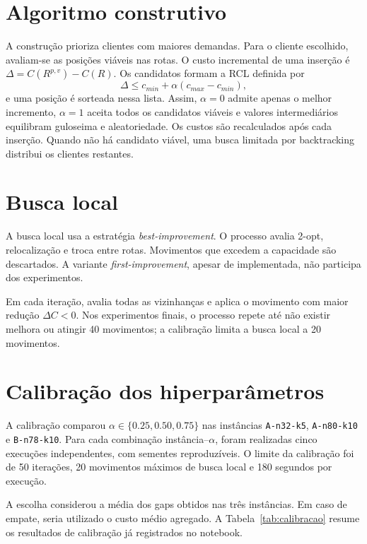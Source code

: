 \documentclass[12pt]{article}
\begin{document}
\section{Algoritmo construtivo}

A construção prioriza clientes com maiores demandas. Para o cliente escolhido, avaliam-se as posições viáveis nas rotas. O custo incremental de uma inserção é $\Delta=C(R^{p,v})-C(R)$. Os candidatos formam a RCL definida por
\begin{equation}
\Delta \leq c_{min}+\alpha(c_{max}-c_{min}),
\end{equation}
e uma posição é sorteada nessa lista. Assim, $\alpha=0$ admite apenas o melhor incremento, $\alpha=1$ aceita todos os candidatos viáveis e valores intermediários equilibram guloseima e aleatoriedade. Os custos são recalculados após cada inserção. Quando não há candidato viável, uma busca limitada por backtracking distribui os clientes restantes.

\section{Busca local}

A busca local usa a estratégia \textit{best-improvement}. O processo avalia 2-opt, relocalização e troca entre rotas. Movimentos que excedem a capacidade são descartados. A variante \textit{first-improvement}, apesar de implementada, não participa dos experimentos.

Em cada iteração, avalia todas as vizinhanças e aplica o movimento com maior redução $\Delta C<0$. Nos experimentos finais, o processo repete até não existir melhora ou atingir 40 movimentos; a calibração limita a busca local a 20 movimentos.

\section{Calibração dos hiperparâmetros}

A calibração comparou $\alpha\in\{0.25,0.50,0.75\}$ nas instâncias \texttt{A-n32-k5}, \texttt{A-n80-k10} e \texttt{B-n78-k10}. Para cada combinação instância--$\alpha$, foram realizadas cinco execuções independentes, com sementes reproduzíveis. O limite da calibração foi de 50 iterações, 20 movimentos máximos de busca local e 180 segundos por execução.

A escolha considerou a média dos gaps obtidos nas três instâncias. Em caso de empate, seria utilizado o custo médio agregado. A Tabela~\ref{tab:calibracao} resume os resultados de calibração já registrados no notebook.
\end{document}
